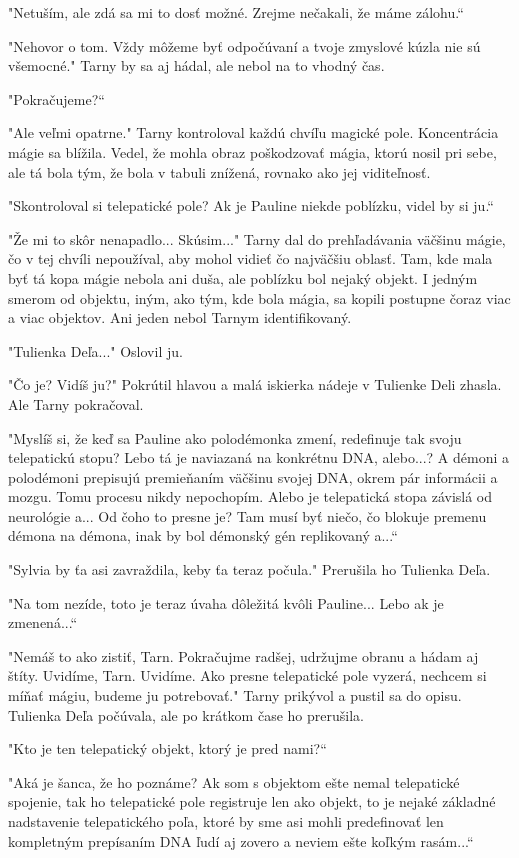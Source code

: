 \documentclass{book}
\begin{document}
"$ $Netuším, ale zdá sa mi to dosť možné. Zrejme nečakali, že máme zálohu.“

"$ $Nehovor o tom. Vždy môžeme byť odpočúvaní a tvoje zmyslové kúzla nie sú všemocné."$ $ Tarny by sa aj hádal, ale nebol na to vhodný čas.

"$ $Pokračujeme?“

"$ $Ale veľmi opatrne."$ $ Tarny kontroloval každú chvíľu magické pole. Koncentrácia mágie sa blížila. Vedel, že mohla obraz poškodzovať mágia, ktorú nosil pri sebe, ale tá bola tým, že bola v tabuli znížená, rovnako ako jej viditeľnosť.

"$ $Skontroloval si telepatické pole? Ak je Pauline niekde poblízku, videl by si ju.“

"$ $Že mi to skôr nenapadlo... Skúsim..."$ $ Tarny dal do prehľadávania väčšinu mágie, čo v tej chvíli nepoužíval, aby mohol vidieť čo najväčšiu oblasť. Tam, kde mala byť tá kopa mágie nebola ani duša, ale poblízku bol nejaký objekt. I jedným smerom od objektu, iným, ako tým, kde bola mágia, sa kopili postupne čoraz viac a viac objektov. Ani jeden nebol Tarnym identifikovaný.

"$ $Tulienka Deľa..."$ $ Oslovil ju.

"$ $Čo je? Vidíš ju?"$ $ Pokrútil hlavou a malá iskierka nádeje v Tulienke Deli zhasla. Ale Tarny pokračoval.

"$ $Myslíš si, že keď sa Pauline ako polodémonka zmení, redefinuje tak svoju telepatickú stopu? Lebo tá je naviazaná na konkrétnu DNA, alebo...? A démoni a polodémoni prepisujú premieňaním väčšinu svojej DNA, okrem pár informácii a mozgu. Tomu procesu nikdy nepochopím. Alebo je telepatická stopa závislá od neurológie a... Od čoho to presne je? Tam musí byť niečo, čo blokuje premenu démona na démona, inak by bol démonský gén replikovaný a...“

"$ $Sylvia by ťa asi zavraždila, keby ťa teraz počula."$ $ Prerušila ho Tulienka Deľa.

"$ $Na tom nezíde, toto je teraz úvaha dôležitá kvôli Pauline... Lebo ak je zmenená...“

"$ $Nemáš to ako zistiť, Tarn. Pokračujme radšej, udržujme obranu a hádam aj štíty. Uvidíme, Tarn. Uvidíme. Ako presne telepatické pole vyzerá, nechcem si míňať mágiu, budeme ju potrebovať."$ $ Tarny prikývol a pustil sa do opisu. Tulienka Deľa počúvala, ale po krátkom čase ho prerušila.

"$ $Kto je ten telepatický objekt, ktorý je pred nami?“

"$ $Aká je šanca, že ho poznáme? Ak som s objektom ešte nemal telepatické spojenie, tak ho telepatické pole registruje len ako objekt, to je nejaké základné nadstavenie telepatického poľa, ktoré by sme asi mohli predefinovať len kompletným prepísaním DNA ľudí aj zovero a neviem ešte koľkým rasám...“
\end{document}
